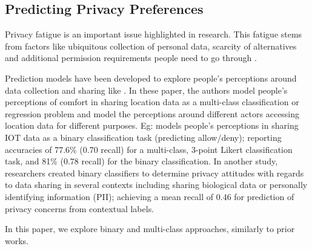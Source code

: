 \subsection{Predicting Privacy Preferences}
Privacy fatigue is an important issue highlighted in research. This fatigue stems from factors like ubiquitous collection of personal data, scarcity of alternatives and additional permission requirements people need to go through \cite{tradeoff,privacy_exhaustion,privacy_risk_awareness}. 

Prediction models have been developed to explore people's perceptions around data collection and sharing like \cite{privacy_prediction,privacy_prediction2,privacy_prediction3,naeini,location_advertising,martin}. In these paper, the authors model people's perceptions of comfort in sharing location data as a multi-class classification or regression problem and model the perceptions around different actors accessing location data for different purposes. Eg: \cite{naeini} models people's perceptions in sharing IOT data as a binary classification task (predicting allow/deny); reporting accuracies of 77.6\% (0.70 recall) for a multi-class, 3-point Likert classification task, and 
81\% (0.78 recall) for the binary classification.
In another study, researchers created binary classifiers to determine privacy attitudes with regards to data sharing in several contexts including sharing biological data or personally identifying information (PII)\cite{contextualLabel}; achieving a mean recall of 0.46 for prediction of privacy concerns from contextual labels. 

In this paper, we explore binary and multi-class approaches, similarly to prior works.

\iffalse 
\textbf{Survey Design.} Research studies on privacy perceptions typically employ factorial vignette approaches to understand how different scenarios affect an individual's willingness to share location data.
Privacy risk perception studies highlight that impersonal, less detailed,
\textit{abstract} risk scenarios are often perceived as less risky\cite{privacy_risk_awareness}. 
Given that risk is a major factor in determining levels of comfort with sharing location data, vignette questions that present location data in abstract ways may underestimate people's privacy boundaries and perceptions. 
Hence, in our survey, we make an effort to explain to the survey participant, the types of location data we refer to, by providing extensive details about the location features and about what they represent.  
Interestingly, some privacy perception studies demonstrate that visualizing abstract data can help alleviate privacy risk concerns and increase people's comfort with data sharing \cite{vizbetter}. This suggests that the way data is presented can significantly impact privacy perceptions.
For that reason, in our survey, we accompany each vignette not only with extensive explanations, but also with map-based visualization to convey better location data information.
\fi 

